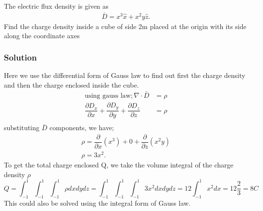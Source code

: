 \begin{exmp}
The electric flux density is given as
\begin{align*}
\bar{D}=x^{3}\hat{x} + x^{2}y\hat{z}.
\end{align*}
Find the charge density inside a cube of side 2m placed at the origin with its side along the coordinate axes

\subsubsection*{Solution}
Here we use the differential form of Gauss law to find out first the charge density and then the charge enclosed inside the cube.\\
\begin{align*}
\text{using gauss law}; \nabla\cdot\bar{D}&=\rho\\
\dfrac{\partial D_{x}}{\partial x}+\dfrac{\partial D_{y}}{\partial y}+\dfrac{\partial 
D_{z}}{\partial z}&=\rho \\
\end{align*}
substituting $\bar{D}$ components, we have;
\begin{align*}
\rho= \dfrac{\partial}{\partial x}(x^{3})+ 0 +\dfrac{\partial }{\partial z}(x^{2}y)\\
\rho=3x^{2} .
\end{align*}
To get the total charge enclosed Q, we take the volume integral of the charge density $\rho$
\begin{dmath*}
Q=\int_{-1}^{1}\int_{-1}^{1}\int_{-1}^{1}\rho dxdydz
=\int_{-1}^{1}\int_{-1}^{1}\int_{-1}^{1}3x^{2}dxdydz
=12\int_{-1}^{1}x^{2}dx= 12\frac{2}{3}
= 8 C
\end{dmath*}
This could also be solved using the integral form of Gauss law.
\end{exmp}

